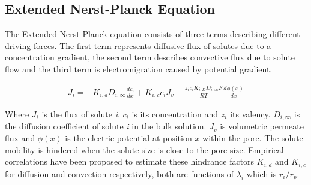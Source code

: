 \subsection{Extended Nerst-Planck Equation }
The Extended Nerst-Planck equation consists of three terms describing different driving forces. 
The first term represents diffusive flux of solutes due to a concentration gradient, the second term describes convective flux due to solute flow and the third term is electromigration caused by potential gradient. 
 \citep{wangPoreModelNanofiltration2021}


\begin{ceqn} 
    \begin{align} 
        J_i=-K_{i,d}D_{i,\infty}\frac{dc_i}{dx}+K_{i,c}c_iJ_v-\frac{z_i c_iK_{i,D}D_{i,\infty}F}{RT}\frac{d\phi(x)}{dx}
        \label{eq:Extended_nerst_planck_equation_ENP}
    \end{align}
\end{ceqn}    

Where $J_i$ is the flux of solute \textit{i}, $c_i$ is its concentration and $z_i$ its valency.
$D_{i,\infty}$ is the diffusion coefficient of solute \textit{i} in the bulk solution. 
$J_v$ is volumetric permeate flux and $\phi(x)$ is the electric potential at position $x$ within the pore. 
  \citep{wangPoreModelNanofiltration2021} \citep{MIT_2018_DSPM_DE_Fabrication}
The solute mobility is hindered when the solute size is close to the pore size. \citep{MIT_2018_DSPM_DE_Fabrication} 
Empirical correlations have been proposed to estimate these hindrance factors $K_{i,d}$ and $K_{i,c}$ for diffusion and convection respectively, both are functions of $\lambda_i$ which is $r_i/r_p$.  
\citep{wangPoreModelNanofiltration2021}

